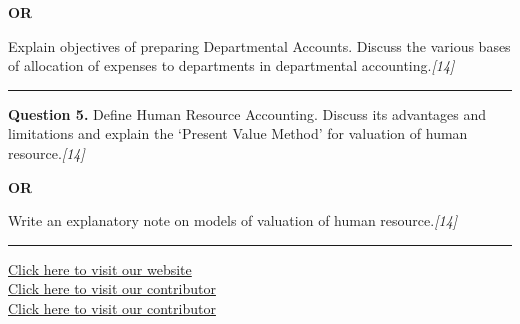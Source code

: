 \documentclass[11pt,a4paper]{article}
\newcommand{\pts}[1]{\hfill   \textit{[#1]}}
\begin{document}
\centerline{   \textbf{OR}}

Explain objectives of preparing Departmental Accounts. Discuss the various bases of allocation of expenses to departments in departmental accounting.\pts{14}

\medskip\rule{\linewidth}{0.2pt}




\noindent   \textbf{Question 5.}
Define Human Resource Accounting. Discuss its advantages and limitations and explain the `Present Value Method' for valuation of human resource.\pts{14}

\centerline{   \textbf{OR}}

Write an explanatory note on models of valuation of human resource.\pts{14}

\vfill
\rule{\linewidth}{0.4pt}

\begin{center}\small
\href{https://bhu-exam.vercel.app/}{Click here to visit our website}\\[4pt]
\href{https://me-aryan.vercel.app/}{Click here to visit our contributor}\\[4pt]
\href{https://quashan-me.vercel.app/}{Click here to visit our contributor}
\end{center}
\end{document}
